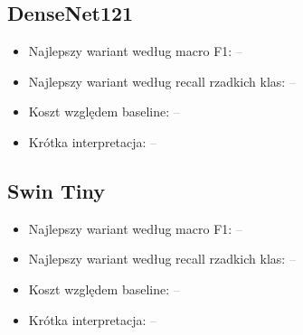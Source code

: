 \documentclass[11pt,a4paper]{article}
\newcommand{\missingresult}{\textcolor{gray}{--}}
\begin{document}
\subsection{DenseNet121}

\begin{itemize}
  \item Najlepszy wariant według macro F1: \missingresult
  \item Najlepszy wariant według recall rzadkich klas: \missingresult
  \item Koszt względem baseline: \missingresult
  \item Krótka interpretacja: \missingresult
\end{itemize}

\subsection{Swin Tiny}

\begin{itemize}
  \item Najlepszy wariant według macro F1: \missingresult
  \item Najlepszy wariant według recall rzadkich klas: \missingresult
  \item Koszt względem baseline: \missingresult
  \item Krótka interpretacja: \missingresult
\end{itemize}
\end{document}
